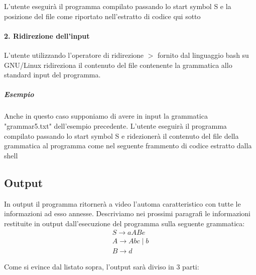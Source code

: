 \documentclass[12pt]{article}
\begin{document}
L'utente eseguirà il programma compilato passando lo start symbol S e la posizione del file come riportato nell'estratto di codice qui sotto


\paragraph{2. Ridirezione dell'input}L'utente utilizzando l'operatore di ridirezione $>$ fornito dal linguaggio bash su GNU/Linux ridireziona il contenuto del file contenente la grammatica allo standard input del programma. 

\subparagraph{Esempio}
Anche in questo caso supponiamo di avere in input la grammatica "grammar5.txt" dell'esempio precedente. L'utente eseguirà il programma compilato passando lo start symbol S e ridezionerà il contenuto del file della grammatica al programma come nel seguente frammento di codice estratto dalla shell



\subsection{Output}\label{output}
In output il programma ritornerà a video l'automa caratteristico con tutte le informazioni ad esso annesse. Descriviamo nei prossimi paragrafi le informazioni restituite in output dall'esecuzione del programma sulla seguente grammatica: 
\begin{align*}
    S \to aABe \\
	A \to Abc \mid b \\
	B \to d 
\end{align*}



Come si evince dal listato sopra, l'output sarà diviso in 3 parti:
\end{document}
